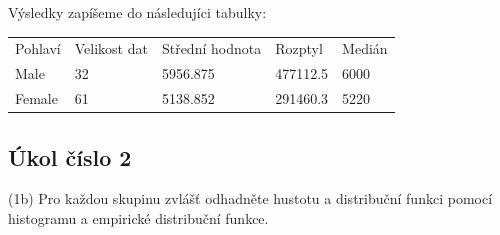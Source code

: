 \documentclass[paper=a4, fontsize=12pt]{scrartcl}
\numberwithin{equation}{section}		%
\numberwithin{figure}{section}			%
\numberwithin{table}{section}				%
\begin{document}
Výsledky zapíšeme do následujíci tabulky:\\
\begin{table}[htb]
\begin{tabular}{lllll}
\rowcolor[HTML]{EFEFEF}
Pohlaví & Velikost dat & Střední hodnota & Rozptyl & Medián \\
\cellcolor[HTML]{EFEFEF}Male     &     32       &         5956.875        &   477112.5      &   6000     \\
\cellcolor[HTML]{EFEFEF}Female   &      61       &         5138.852        &    291460.3     &   5220    
\end{tabular}
\end{table}

\subsection{Úkol číslo 2}
(1b) Pro každou skupinu zvlášť odhadněte hustotu a distribuční funkci pomocí histogramu a empirické distribuční funkce.
\end{document}
